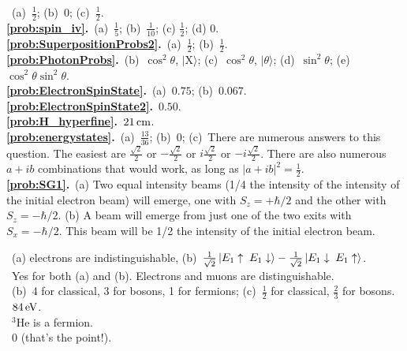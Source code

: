 \medskip


~(a)~$\frac{1}{2}$; (b)~$0$; 
(c)~$\frac{1}{2}$.\\
{\bf \ref{prob:spin_iv}.}~(a)~$\frac{1}{5}$; (b)~$\frac{1}{10}$; (c) $\frac{1}{2}$; (d) 0.\\
{\bf \ref{prob:SuperpositionProbs2}.}~(a)~$\frac{1}{2}$; (b)~$\frac{1}{2}$.\\
{\bf \ref{prob:PhotonProbs}.}~(b)~$\cos^2\theta$, $\vert\mbox{X}\rangle$; 
(c)~$\cos^2\theta$, $\vert\mbox{$\theta$}\rangle$; 
(d)~$\sin^2\theta$; 
(e)~$\cos^2\theta\sin^2\theta$.\\
{\bf \ref{prob:ElectronSpinState}.}~(a)~$0.75$; (b)~$0.067$.\\
{\bf \ref{prob:ElectronSpinState2}.}~$0.50$.\\
{\bf \ref{prob:H_hyperfine}.}~$21\,\mbox{cm}$.\\
{\bf \ref{prob:energystates}.}~(a)~$\frac{13}{36}$; (b)~0; (c)~There are
numerous answers to this question.  The easiest are 
$\frac{\sqrt{2}}{2}$ or $-\frac{\sqrt{2}}{2}$ or $i \frac{\sqrt{2}}{2}$ or
$-i \frac{\sqrt{2}}{2}$. There are also numerous $a+i b$ combinations that
would work, as long as $|a+i b|^2 = \frac{1}{2}$.\\
{\bf \ref{prob:SG1}.}~(a) Two equal intensity beams (1/4 the intensity of the
intensity of the initial electron beam) will emerge, one with $S_z =
+\hbar/2$ and the other with $S_z = -\hbar/2$. (b) A beam will emerge 
from just one of the two exits with $S_x = -\hbar/2$.  This beam will be
1/2 the intensity of the initial electron beam.

\medskip


~(a) electrons are indistinguishable, 
(b)~$\frac{1}{\sqrt 2}\,|\mbox{$E_1\uparrow\; E_1\downarrow$}\rangle 
-\frac{1}{\sqrt 2}\,|\mbox{$E_1\downarrow\; E_1\uparrow$}\rangle$.\\
~Yes for both (a) and (b).  Electrons and muons are 
distinguishable.\\
~(b)~4 for classical, 3 for bosons, 1 for fermions; 
(c)~$\frac{1}{2}$ for classical, $\frac{2}{3}$ for bosons.\\
~$84\,\mbox{eV}$.\\
~$^3$He is a fermion.\\
~0 (that's the point!).\\

